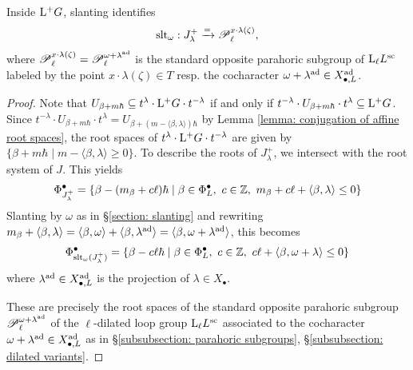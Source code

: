 \begin{lemma}\label{lemma: zeta root of unity -- positive stabilizers}
Inside $\mathrm{L^+} G$, slanting identifies
\begin{equation*}
\operatorname{slt}_{\omega}: J^{+}_{\lambda} \xrightarrow{=} \operatorname{\mathscr{P}}^{x \cdot \lambda(\zeta)}_{\ell},
\end{equation*}    
where $\operatorname{\mathscr{P}}^{x \cdot \lambda(\zeta)}_{\ell} = \operatorname{\mathscr{P}}_{\ell}^{\omega+\lambda^{\operatorname{ad}}}$ is the standard opposite parahoric subgroup of $\mathrm{L}_{\ell} L^{\mathrm{sc}}$ labeled by the point $x \cdot \lambda(\zeta) \in T$ resp. the cocharacter $\omega+\lambda^{\operatorname{ad}} \in X^{\operatorname{ad}}_{\bullet, L}$.
\end{lemma}
\begin{proof}
Note that $U_{\beta + m\hbar} \subseteq t^{\lambda} \cdot \mathrm{L^+} G \cdot t^{-\lambda}$ if and only if $ t^{-\lambda} \cdot U_{\beta + m\hbar} \cdot t^{\lambda} \subseteq \mathrm{L^+} G$. Since $ t^{-\lambda} \cdot U_{\beta + m\hbar} \cdot t^{\lambda} = U_{\beta + (m - \langle \beta, \lambda \rangle)\hbar}$ by Lemma \ref{lemma: conjugation of affine root spaces}, the root spaces of $t^{\lambda} \cdot \mathrm{L^+} G \cdot t^{-\lambda}$ are given by
$\{ \beta + m\hbar \mid m - \langle \beta, \lambda \rangle \geq 0 \}$.
%
To describe the roots of $J^{+}_{\lambda}$, we intersect with the root system of $J$. This yields
\begin{equation*}
    \Phi^{\bullet}_{J^{+}_{\lambda}} = \{ \beta - (m_{\beta} + c\ell)\hbar \mid \beta \in \Phi^{\bullet}_L, \ c \in \Z, \ m_{\beta} + c\ell + \langle \beta, \lambda \rangle \leq 0 \}
\end{equation*}
Slanting by $\omega$ as in \S \ref{section: slanting} and rewriting $m_{\beta} + \langle \beta, \lambda \rangle = \langle \beta, \omega \rangle + \langle \beta, \lambda^{\operatorname{ad}} \rangle = \langle \beta, \omega + \lambda^{\operatorname{ad}} \rangle$, this becomes
\begin{equation*}
    \Phi^{\bullet}_{\slant_{\omega}(J^{+}_{\lambda})} = \{ \beta - c\ell\hbar \mid \beta \in \Phi^{\bullet}_L, \ c \in \Z, \ c\ell + \langle \beta, \omega+\lambda \rangle \leq 0 \}
\end{equation*}
where $\lambda^{\operatorname{ad}} \in X^{\operatorname{ad}}_{\bullet, L}$ is the projection of $\lambda \in X_{\bullet}$.

These are precisely the root spaces of the standard opposite parahoric subgroup $\operatorname{\mathscr{P}}^{\omega+\lambda^{\operatorname{ad}}}_{\ell}$ of the $\ell$-dilated loop group $\mathrm{L}_{\ell} L^{\mathrm{sc}}$ associated to the cocharacter $\omega+\lambda^{\operatorname{ad}} \in X_{\bullet, L}^{\operatorname{ad}}$ as in \S \ref{subsubsection: parahoric subgroups}, \S \ref{subsubsection: dilated variants}. 
\end{proof}

